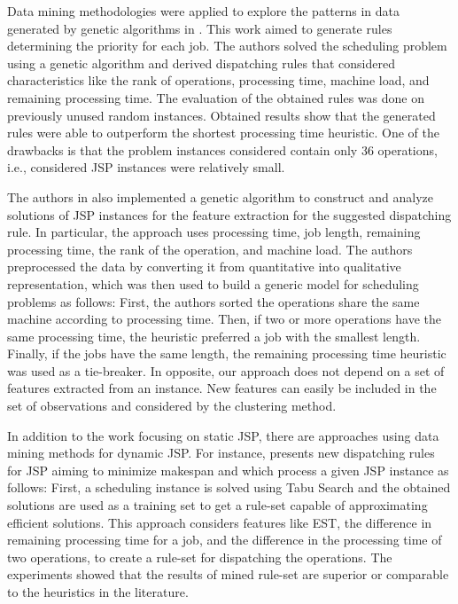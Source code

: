 \documentclass[runningheads]{llncs}
\begin{document}
Data mining methodologies were applied to explore the patterns in data generated by genetic algorithms in \cite{koonce2000using}. This work aimed to generate rules determining the priority for each job. The authors solved the scheduling problem using a genetic algorithm and derived dispatching rules that considered characteristics like the rank of operations, processing time, machine load, and remaining processing time. The evaluation of the obtained rules was done on previously unused random instances. Obtained results show that the generated rules were able to outperform the shortest processing time heuristic. One of the drawbacks is that the problem instances considered contain only 36 operations, i.e., considered JSP instances were relatively small.

The authors in \cite{harrath2002genetic} also implemented a genetic algorithm to construct and analyze solutions of JSP instances for the feature extraction for the suggested dispatching rule. In particular, the approach uses processing time, job length, remaining processing time, the rank of the operation, and machine load. The authors preprocessed the data by converting it from quantitative into qualitative representation, which was then used to build a generic model for scheduling problems as follows: First, the authors sorted the operations share the same machine according to processing time. Then, if two or more operations have the same processing time, the heuristic preferred a job with the smallest length. Finally, if the jobs have the same length, the remaining processing time heuristic was used as a tie-breaker. In opposite, our approach does not depend on a set of features extracted from an instance. New features can easily be included in the set of observations and considered by the clustering method.

In addition to the work focusing on static JSP, there are approaches using data mining methods for dynamic JSP. For instance, \cite{shahzad2010discovering} presents new dispatching rules for JSP aiming to minimize makespan and which process a given JSP instance as follows: 
First, a scheduling instance is solved using Tabu Search and the obtained solutions are used as a training set to get a rule-set capable of approximating efficient solutions. This approach considers features like EST, the difference in remaining processing time for a job, and the difference in the processing time of two operations, to create a rule-set for dispatching the operations. The experiments showed that the results of mined rule-set are superior or comparable to the heuristics in the literature.
\end{document}
